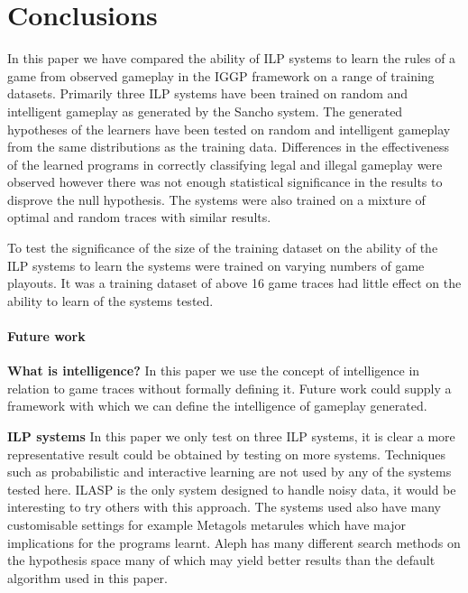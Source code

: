 \chapter{Conclusions}
In this paper we have compared the ability of ILP systems to learn the rules of a game from observed gameplay in the IGGP framework on a range of training datasets. Primarily three ILP systems have been trained on random and intelligent gameplay as generated by the Sancho system. The generated hypotheses of the learners have been tested on random and intelligent gameplay from the same distributions as the training data. Differences in the effectiveness of the learned programs in correctly classifying legal and illegal gameplay were observed however there was not enough statistical significance in the results to disprove the null hypothesis. The systems were also trained on a mixture of optimal and random traces with similar results.

To test the significance of the size of the training dataset on the ability of the ILP systems to learn the systems were trained on varying numbers of game playouts. It was a training dataset of above 16 game traces had little effect on the ability to learn of the systems tested. 

\subsubsection{Future work}

\textbf{What is intelligence?} In this paper we use the concept of intelligence in relation to game traces without formally defining it. Future work could supply a framework with which we can define the intelligence of gameplay generated.

\textbf{ILP systems} In this paper we only test on three ILP systems, it is clear a more representative result could be obtained by testing on more systems. Techniques such as probabilistic\cite{Bellodi/Probablistic,Raedt/Probabalistic} and interactive\cite{Raedt/Interactive} learning are not used by any of the systems tested here. ILASP is the only system designed to handle noisy data\cite{MarkLaw/ILASP2i}, it would be interesting to try others with this approach\cite{Oblak/Noise,Evans/Noise}. The systems used also have many customisable settings for example Metagols metarules which have major implications for the programs learnt\cite{Cropper/Metarules}. Aleph has many different search methods on the hypothesis space many of which may yield better results than the default algorithm used in this paper.

